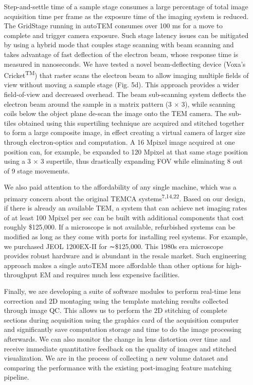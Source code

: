 \documentclass{article}
\begin{document}
Step-and-settle time of a sample stage consumes a large percentage of total image acquisition time per frame as the exposure time of the imaging system is reduced. The GridStage running in autoTEM consumes over 100 ms for a move to complete and trigger camera exposure. Such stage latency issues can be mitigated by using a hybrid mode that couples stage scanning with beam scanning and takes advantage of fast deflection of the electron beam, whose response time is measured in nanoseconds. We have tested a novel beam-deflecting device (Voxa’s Cricket\textsuperscript{TM}) that raster scans the electron beam to allow imaging multiple fields of view without moving a sample stage (Fig. 5d). This approach provides a wider field-of-view and decreased overhead. The beam sub-scanning system deflects the electron beam around the sample in a matrix pattern (3 × 3), while scanning coils below the object plane de-scan the image onto the TEM camera. The sub-tiles obtained using this supertiling technique are acquired and stitched together to form a large composite image, in effect creating a virtual camera of larger size through electron-optics and computation. A 16 Mpixel image acquired at one position can, for example, be expanded to 120 Mpixel at that same stage position using a 3 × 3 supertile, thus drastically expanding FOV while eliminating 8 out of 9 stage movements.

We also paid attention to the affordability of any single machine, which was a primary concern about the original TEMCA systems\textsuperscript{7,14,22}. Based on our design, if there is already an available TEM, a system that can achieve net imaging rates of at least 100 Mpixel per sec can be built with additional components that cost roughly \$125,000. If a microscope is not available, refurbished systems can be modified as long as they come with ports for installing reel systems. For example, we purchased JEOL 1200EX-II for ∼\$125,000. This 1980s era microscope provides robust hardware and is abundant in the resale market. Such engineering approach makes a single autoTEM more affordable than other options for high-throughput EM and requires much less expensive facilities.

Finally, we are developing a suite of software modules to perform real-time lens correction and 2D montaging using the template matching results collected through image QC. This allows us to perform the 2D stitching of complete sections during acquisition using the graphics card of the acquisition computer and significantly save computation storage and time to do the image processing afterwards. We can also monitor the change in lens distortion over time and receive immediate quantitative feedback on the quality of images and stitched visualization. We are in the process of collecting a new volume dataset and comparing the performance with the existing post-imaging feature matching pipeline.
\end{document}
